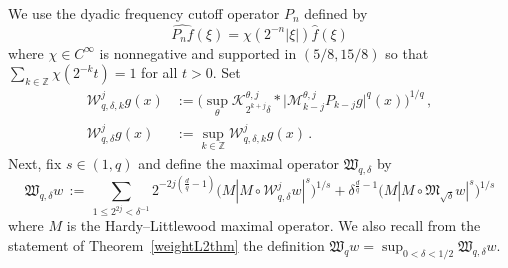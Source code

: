 \documentclass[11pt]{amsart}
\theoremstyle{definition}
\numberwithin{theorem}{section}
\numberwithin{definition}{section}
\newcommand{\Be}{\begin{equation}}
\newcommand{\Ee}{\end{equation}}
\newcommand{\note}[1]{\footnote{\texttt{\Small #1}}}
\def\fM{{\mathfrak {M}}}
\def\fW{{\mathfrak {W}}}
\def\bbZ{{\mathbb {Z}}}
\def\cK{{\mathcal {K}}}
\def\cM{{\mathcal {M}}}
\def\cW{{\mathcal {W}}}
\begin{document}
We use the   dyadic frequency cutoff
operator  $P_n$  defined by
\Be\label{Pndef} \widehat {P_n f}(\xi)=\chi(2^{-n}|\xi|)\widehat f(\xi)\Ee
where $\chi\in C^\infty$ is nonnegative and  supported in $(5/8, 15/8)$ so that
$\sum_{k\in \bbZ} \chi(2^{-k}t)=1$ for all $t>0$.
Set
\begin{align}
\label{cWqdefeqk}
\cW_{q,\delta,k}^j g(x)&:=
\Big(\sup_{\theta} \cK^{\theta,j}_{2^{k+j}\delta} *\big|\cM^{\theta,j}_{k-j}
P_{k-j} g|^q(x) \Big)^{1/q}\, ,
\\
\label{cWqdefeq}\cW_{q,\delta}^j g(x)&:=\sup_{k\in \bbZ} \cW_{q,\delta,k}^j g(x)\, .
\end{align}
Next,  fix $s\in (1,q)$  and define
the maximal operator $\fW_{q,\delta}$ by
\Be \label{fWqdel}\fW_{q,\delta} w\,:=\,\sum_{1\le 2^{2j}<\delta^{-1}}
2^{-2j(\frac dq -1)}\big(
M|M\!\circ\!\cW_{q,\delta}^j w|^s\big)^{1/s}
+\delta^{\frac{d}{q} -1} \big(
M|M\!\circ\!\fM_{\sqrt \delta} w|^s\big)^{1/s}
\Ee
where $M$ is the Hardy--Littlewood maximal operator.
We also recall from the statement of Theorem~\ref{weightL2thm} the definition
$\fW_qw=
\sup_{0<\delta< 1/2}\fW_{q,\delta}w.$





\end{document}

